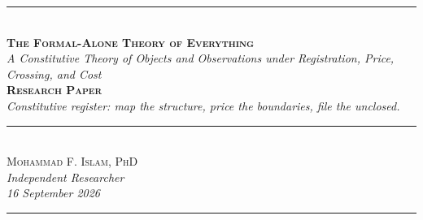 \documentclass[10pt]{article}
\renewcommand{\_}{\origunderscore\allowbreak}
\begin{document}
\begin{center}
{\color{accent}\rule{0.6\textwidth}{0.8pt}}\\[10pt]
{\bfseries\scshape\fontsize{20}{23}\selectfont The Formal-Alone Theory
of Everything}\\[7pt]
{\itshape\large A Constitutive Theory of Objects and Observations under
Registration, Price, Crossing, and Cost}\\[8pt]
{\footnotesize\color{accent}\scshape\bfseries Research Paper}\\[3pt]
{\itshape\color{deep}\small Constitutive register: map the structure,
price the boundaries, file the unclosed.}\\[9pt]
{\color{accent}\rule{0.6\textwidth}{0.8pt}}\\[10pt]
{\scshape Mohammad F. Islam, PhD}\\[2pt]
{\itshape\color{faint}\small Independent Researcher}\\[2pt]
{\itshape\color{faint}\small 16 September 2026}\\[14pt]
\end{center}
{\color{accent}\rule{\textwidth}{0.6pt}}\\[4pt]
\end{document}
